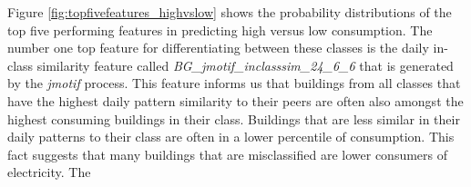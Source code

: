 Figure \ref{fig:topfivefeatures_highvslow} shows the probability distributions of the top five performing features in predicting high versus low consumption. The number one top feature for differentiating between these classes is the daily in-class similarity feature called \emph{BG_jmotif_inclasssim_24_6_6} that is generated by the \emph{jmotif} process. This feature informs us that buildings from all classes that have the highest daily pattern similarity to their peers are often also amongst the highest consuming buildings in their class. Buildings that are less similar in their daily patterns to their class are often in a lower percentile of consumption. This fact suggests that many buildings that are misclassified are lower consumers of electricity. The 